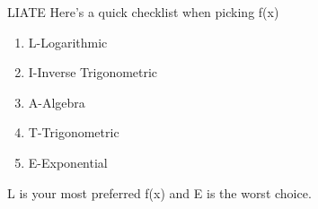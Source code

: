 	\begin{theorem}{LIATE}{}
	Here's a quick checklist when picking f(x)
	\begin{enumerate}
	    \item L-Logarithmic 
	    \item I-Inverse Trigonometric
	    \item A-Algebra
	    \item T-Trigonometric
	    \item E-Exponential
	\end{enumerate}
	L is your most preferred f(x) and E is the worst choice.\footnotemark
	\end{theorem}

